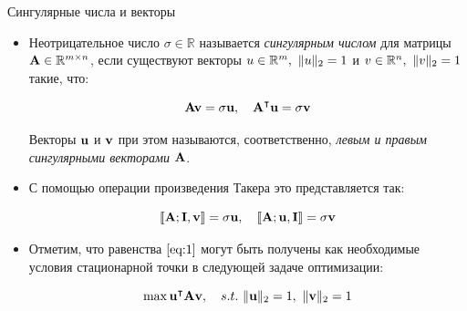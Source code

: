 \begin{frame}{Сингулярные числа и векторы}
\begin{itemize}
    \item 
    Неотрицательное число $\sigma \in \mathbb{R}$ называется \textit{сингулярным числом} для матрицы $\textbf{A} \in \mathbb{R}^{m \times n}$, если существуют векторы $u \in \mathbb{R}^m, \ \norm{u}_2 = 1$ и $v \in \mathbb{R}^n, \ \lVert v \rVert_2 = 1$ такие, что:

\begin{equation}
\label{eq:1}
    \textbf{Av} = \sigma \textbf{u}, \quad \textbf{A}^{\intercal} \textbf{u} = \sigma \textbf{v}
\end{equation}

Векторы $\textbf{u}$ и $\textbf{v}$ при этом называются, соответственно, \textit{левым и правым сингулярными векторами} $\textbf{A}$.

\item С помощью операции произведения Такера это представляется так:

$$ \llbracket \textbf{A}; \textbf{I}, \textbf{v} \rrbracket = \sigma \textbf{u}, \quad  \llbracket \textbf{A}; \textbf{u}, \textbf{I} \rrbracket = \sigma \textbf{v}$$

\item Отметим, что равенства $\ref{eq:1}$ могут быть получены как необходимые условия стационарной точки в следующей задаче оптимизации:

$$ \max{\textbf{u}^{\intercal}\textbf{A}\textbf{v}}, \quad s.t. \ \lVert \textbf{u} \rVert_2 = 1, \ \lVert \textbf{v} \rVert_2 = 1 $$




\end{itemize}
 



\end{frame}
